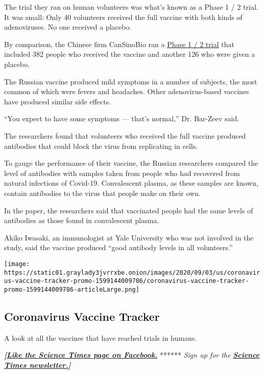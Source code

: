 The trial they ran on human volunteers was what's known as a Phase 1 / 2
trial. It was small: Only 40 volunteers received the full vaccine with
both kinds of adenoviruses. No one received a placebo.

By comparison, the Chinese firm CanSinoBio ran a
\href{https://www.thelancet.com/journals/lancet/article/PIIS0140-6736(20)31605-6/fulltext}{Phase
1 / 2 trial} that included 382 people who received the vaccine and
another 126 who were given a placebo.

The Russian vaccine produced mild symptoms in a number of subjects, the
most common of which were fevers and headaches. Other adenovirus-based
vaccines have produced similar side effects.

``You expect to have some symptoms --- that's normal,'' Dr. Bar-Zeev
said.

The researchers found that volunteers who received the full vaccine
produced antibodies that could block the virus from replicating in
cells.

To gauge the performance of their vaccine, the Russian researchers
compared the level of antibodies with samples taken from people who had
recovered from natural infections of Covid-19. Convalescent plasma, as
these samples are known, contain antibodies to the virus that people
make on their own.

In the paper, the researchers said that vaccinated people had the same
levels of antibodies as those found in convalescent plasma.

Akiko Iwasaki, an immunologist at Yale University who was not involved
in the study, said the vaccine produced ``good antibody levels in all
volunteers.''

\href{https://www.nytimes3xbfgragh.onion/interactive/2020/science/coronavirus-vaccine-tracker.html}{}

\texttt{[image: https://static01.graylady3jvrrxbe.onion/images/2020/09/03/us/coronavirus-vaccine-tracker-promo-1599144009786/coronavirus-vaccine-tracker-promo-1599144009786-articleLarge.png]}

\hypertarget{coronavirus-vaccine-tracker}{%
\subsection{Coronavirus Vaccine
Tracker}\label{coronavirus-vaccine-tracker}}

A look at all the vaccines that have reached trials in humans.

\textbf{\emph{{[}}\href{http://on.fb.me/1paTQ1h}{\emph{Like the Science
Times page on Facebook.}}} ****** \emph{\textbar{} Sign up for the}
\textbf{\href{http://nyti.ms/1MbHaRU}{\emph{Science Times
newsletter.}}\emph{{]}}}

